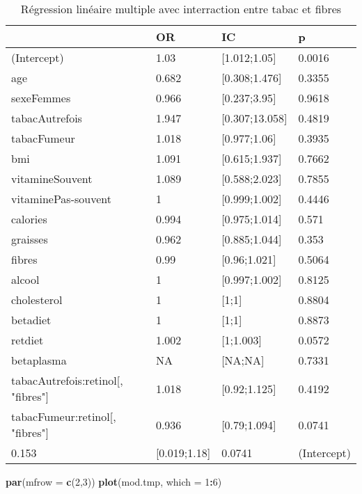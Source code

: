\documentclass[]{article}
\newenvironment{Shaded}{\begin{snugshade}}{\end{snugshade}}
\newcommand{\KeywordTok}[1]{\textcolor[rgb]{0.13,0.29,0.53}{\textbf{#1}}}
\newcommand{\DataTypeTok}[1]{\textcolor[rgb]{0.13,0.29,0.53}{#1}}
\newcommand{\DecValTok}[1]{\textcolor[rgb]{0.00,0.00,0.81}{#1}}
\newcommand{\OperatorTok}[1]{\textcolor[rgb]{0.81,0.36,0.00}{\textbf{#1}}}
\newcommand{\NormalTok}[1]{#1}
\begin{document}
\begin{table}

\caption{\label{tab:unnamed-chunk-85}Régression linéaire multiple avec interraction entre tabac et fibres}
\centering
\begin{tabular}[t]{l|l|l|l}
\hline
  & OR & IC & p\\
\hline
\rowcolor[HTML]{BBD2E1}  (Intercept) & 1.03 & [1.012;1.05] & 0.0016\\
\hline
age & 0.682 & [0.308;1.476] & 0.3355\\
\hline
\rowcolor[HTML]{BBD2E1}  sexeFemmes & 0.966 & [0.237;3.95] & 0.9618\\
\hline
tabacAutrefois & 1.947 & [0.307;13.058] & 0.4819\\
\hline
\rowcolor[HTML]{BBD2E1}  tabacFumeur & 1.018 & [0.977;1.06] & 0.3935\\
\hline
bmi & 1.091 & [0.615;1.937] & 0.7662\\
\hline
\rowcolor[HTML]{BBD2E1}  vitamineSouvent & 1.089 & [0.588;2.023] & 0.7855\\
\hline
vitaminePas-souvent & 1 & [0.999;1.002] & 0.4446\\
\hline
\rowcolor[HTML]{BBD2E1}  calories & 0.994 & [0.975;1.014] & 0.571\\
\hline
graisses & 0.962 & [0.885;1.044] & 0.353\\
\hline
\rowcolor[HTML]{BBD2E1}  fibres & 0.99 & [0.96;1.021] & 0.5064\\
\hline
alcool & 1 & [0.997;1.002] & 0.8125\\
\hline
\rowcolor[HTML]{BBD2E1}  cholesterol & 1 & [1;1] & 0.8804\\
\hline
betadiet & 1 & [1;1] & 0.8873\\
\hline
\rowcolor[HTML]{BBD2E1}  retdiet & 1.002 & [1;1.003] & 0.0572\\
\hline
betaplasma & NA & [NA;NA] & 0.7331\\
\hline
\rowcolor[HTML]{BBD2E1}  tabacAutrefois:retinol[, "fibres"] & 1.018 & [0.92;1.125] & 0.4192\\
\hline
tabacFumeur:retinol[, "fibres"] & 0.936 & [0.79;1.094] & 0.0741\\
\hline
\rowcolor[HTML]{BBD2E1}  0.153 & [0.019;1.18] & 0.0741 & (Intercept)\\
\hline
\end{tabular}
\end{table}

\begin{Shaded}
\begin{Highlighting}[]
\KeywordTok{par}\NormalTok{(}\DataTypeTok{mfrow =} \KeywordTok{c}\NormalTok{(}\DecValTok{2}\NormalTok{,}\DecValTok{3}\NormalTok{))}
\KeywordTok{plot}\NormalTok{(mod.tmp, }\DataTypeTok{which =} \DecValTok{1}\OperatorTok{:}\DecValTok{6}\NormalTok{)}
\end{Highlighting}
\end{Shaded}
\end{document}
